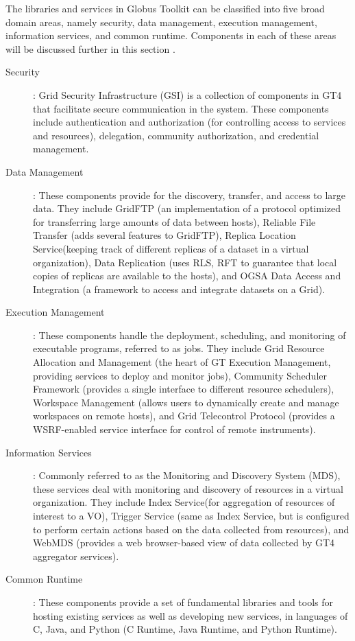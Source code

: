\documentclass[9pt,twocolumn,twoside]{styles/osajnl}
\begin{document}
The libraries and services in Globus Toolkit can be classified into five broad domain areas, namely security, data management, execution management, information services, and common runtime. Components in each of these areas will be discussed further in this section \cite{sotomayor2006globus}.
\begin{description}

\item[Security]: Grid Security Infrastructure (GSI) is a collection of components in GT4 that facilitate secure communication in the system. These components include authentication and authorization (for controlling access to services and resources), delegation, community authorization, and credential management.

\item[Data Management]: These components provide for the discovery, transfer, and access to large data. They include GridFTP (an implementation of a protocol optimized for transferring large amounts of data between hosts), Reliable File Transfer (adds several features to GridFTP), Replica Location Service(keeping track of different replicas of a dataset in a virtual organization), Data Replication (uses RLS, RFT to guarantee that local copies of replicas are available to the hosts), and OGSA Data Access and Integration (a framework to access and integrate datasets on a Grid).

\item[Execution Management]: These components handle the deployment, scheduling, and monitoring of executable programs, referred to as jobs. They include Grid Resource Allocation and Management (the heart of GT Execution Management, providing services to deploy and monitor jobs), Community Scheduler Framework (provides a single interface to different resource schedulers), Workspace Management (allows users to dynamically create and manage workspaces on remote hosts), and Grid Telecontrol Protocol (provides a WSRF-enabled service interface for control of remote instruments).  

\item[Information Services]: Commonly referred to as the Monitoring and Discovery System (MDS), these services deal with monitoring and discovery of resources in a virtual organization. They include Index Service(for aggregation of resources of interest to a VO), Trigger Service (same as Index Service, but is configured to perform certain actions based on the data collected from resources), and WebMDS (provides a web browser-based view of data collected by GT4 aggregator services).

\item[Common Runtime]: These components provide a set of fundamental libraries and tools for hosting existing services as well as developing new services, in languages of C, Java, and Python (C Runtime, Java Runtime, and Python Runtime).

\end{description}
\end{document}
